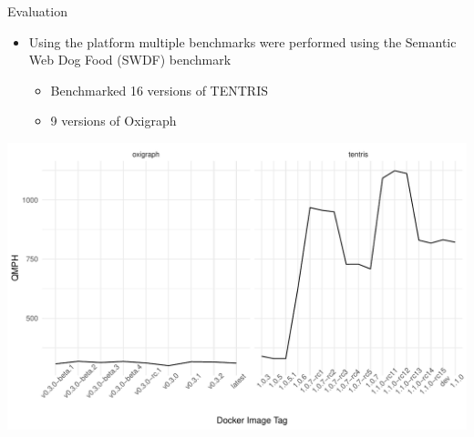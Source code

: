 \begin{frame}{Evaluation}
	\begin{itemize}
		\item Using the platform multiple benchmarks were performed using the Semantic Web Dog Food (SWDF) benchmark
		\begin{itemize}
			\item Benchmarked 16 versions of TENTRIS
			\item 9 versions of Oxigraph
		\end{itemize}
	\end{itemize}
	
	\centering
	\includegraphics[width=.8\textwidth]{images/basilisk/QMPH.pdf}
\end{frame}

